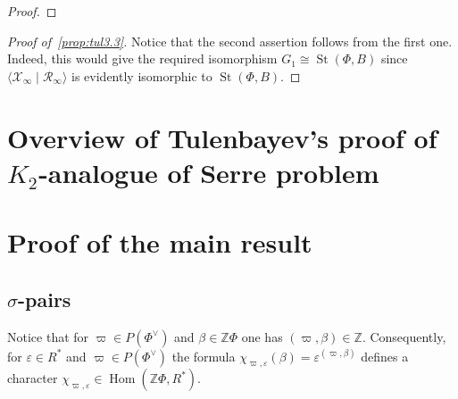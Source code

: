 \documentclass[oneside, 10pt]{amsart}
\DeclareMathOperator{\St}{St}
\DeclareMathOperator{\Hom}{Hom}
\newcommand{\ZZ}{\mathbb{Z}}
\newcommand{\XX}[1]{\mathcal{X}_{#1}}
\newcommand{\RR}[1]{\mathcal{R}_{#1}}
\numberwithin{equation}{section}
\numberwithin{lemma}{section}
\theoremstyle{definition}
\theoremstyle{remark}
\begin{document}
\begin{proof}
\begin{comment}
 = {}^{S_{-\beta}(t^d)}\![x_{\alpha+\beta}(b't^{m+1-d}), S_\gamma(at^d)] & \text{ by~\eqref{eq:verify-bmp1'}} \\
 = [S_{\alpha}(b't^{m+1}) x_{\alpha+\beta}(b't^{m+1-d}), S_\gamma(at^d)] & \text{ by~\eqref{eq:verify-bmp1'} and $(b_d)$ if $d\leq m$ or Case~\eqref{case:2} if $d=m+1$ }\\
 = {}^{S_{\alpha}(b't^{m+1})}\!S_{\alpha+\beta+\gamma}(abt^{m+1}) [S_{\alpha}(b't^{m+1}), S_\gamma(at^d)] & \text{ by~\eqref{eq:H1ii} and~\eqref{eq:verify-bmp1'}} \\
 = S_{\alpha+\beta+\gamma}(abt^{m+1}) [S_{\alpha}(b't^{m+1}), S_\gamma(at^d)] & \text{ by Case~\eqref{case:3a},}
\end{align*}
from which the required identity follows. \qedhere
\end{enumerate}
\end{enumerate}
\end{comment}
\end{proof}

\begin{proof}[Proof of~\cref{prop:tul3.3}]
Notice that the second assertion follows from the first one.
Indeed, this would give the required isomorphism $G_1 \cong \St(\Phi, B)$ since $\langle \XX{\infty} \mid \RR{\infty} \rangle$ is evidently isomorphic to $\St(\Phi, B)$.

\end{proof}



\section{Overview of Tulenbayev's proof of $K_2$-analogue of Serre problem}

\section{Proof of the main result}

\subsection{$\sigma$-pairs}
Notice that for $\varpi \in P(\Phi^\vee)$ and $\beta \in \ZZ \Phi$ one has $(\varpi, \beta) \in \ZZ $.
Consequently, for $\varepsilon \in R^*$ and $\varpi \in P(\Phi^\vee)$ the formula $\chi_{\varpi, \varepsilon}(\beta) = \varepsilon ^ {(\varpi, \beta)}$
defines a character $\chi_{\varpi, \varepsilon} \in \Hom(\ZZ \Phi, R^*)$.
\end{document}
